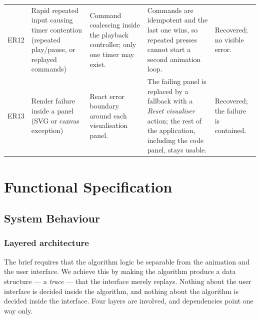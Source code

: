 \documentclass[11pt,a4paper]{article}
\begin{document}
{\begin{longtable}{@{}L{0.9cm}L{3.3cm}L{3.0cm}L{5.9cm}L{2.0cm}@{}}
ER12 & Rapid repeated input causing timer contention (repeated play/pause, or replayed
commands) &
Command coalescing inside the playback controller; only one timer may exist. &
Commands are idempotent and the last one wins, so repeated presses cannot start a second
animation loop. &
Recovered; no visible error. \\

ER13 & Render failure inside a panel (SVG or canvas exception) &
React error boundary around each visualisation panel. &
The failing panel is replaced by a fallback with a \emph{Reset visualiser} action; the rest
of the application, including the code panel, stays usable. &
Recovered; the failure is contained. \\
\end{longtable}
}

\section{Functional Specification}

\subsection{System Behaviour}

\subsubsection{Layered architecture}

The brief requires that the algorithm logic be separable from the animation and the user
interface. We achieve this by making the algorithm produce a data structure --- a
\emph{trace} --- that the interface merely replays. Nothing about the user interface is
decided inside the algorithm, and nothing about the algorithm is decided inside the
interface. Four layers are involved, and dependencies point one way only.
\end{document}
